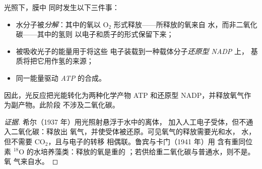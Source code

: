 \begin{proposition}[类囊体中发生了什么]\label{prop:g12:photosynthesis:lightphase}
光照下，膜中
同时发生以下三件事：
\begin{itemize}
  \item 水分子被\emph{分解}：其中的氧以
        $\mathrm{O_2}$ 形式释放——所释放的氧来自
        水，而非二氧化碳——其中的氢则
        以电子和质子的形式保留下来；
  \item 被吸收光子的能量用于将这些
        电子装载到一种载体分子\emph{还原型 NADP} 上，
        基质将把它用作氢的来源；
  \item 同一能量驱动 \emph{ATP} 的合成。
\end{itemize}
因此，光反应把光能转化为两种化学产物 ATP
和还原型 NADP，并释放氧气作为副产物。此阶段
不涉及二氧化碳。
\end{proposition}
\begin{proof}[证据]
希尔（1937 年）用光照射悬浮于水中的离体，
加入人工电子受体，但不通入二氧化碳：释放出
氧气，并使受体被还原。可见氧气的释放需要光和水，
水，但不需要 $\mathrm{CO_2}$，且与电子的转移
相偶联。鲁宾与卡门（1941 年）用
含有重同位素 $^{18}$O 的水培养藻类：释放的氧是重的
；若供给重二氧化碳与普通水，则不是。氧
气来自水。
\end{proof}

